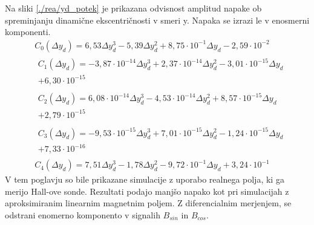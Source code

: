 Na sliki \ref{./rea/yd_potek} je prikazana odvisnost amplitud napake ob spreminjanju dinamične ekscentričnosti v smeri y. Napaka se izrazi le v enosmerni komponenti.
\begin{eqnarray}
&C_0(\Delta y_d) =6,53\Delta y_d^{3}-5,39\Delta y_d^{2}+8,75\cdot 10^{-1}\Delta y_d-2,59\cdot 10^{-2} \\                               
&\begin{split}C_1(\Delta y_d) =-3,87\cdot 10^{-14}\Delta y_d^{3}+2,37\cdot 10^{-14}\Delta y_d^{2}-3,01\cdot 10^{-15}\Delta y_d\\+6,30\cdot 10^{-15}\end{split} \\
&\begin{split}C_2(\Delta y_d) =6,08\cdot 10^{-14}\Delta y_d^{3}-4,53\cdot 10^{-14}\Delta y_d^{2}+8,57\cdot 10^{-15}\Delta y_d\\+2,79\cdot 10^{-15}\end{split} \\ 
&\begin{split}C_3(\Delta y_d) =-9,53\cdot 10^{-15}\Delta y_d^{3}+7,01\cdot 10^{-15}\Delta y_d^{2}-1,24\cdot 10^{-15}\Delta y_d\\+7,33\cdot 10^{-16}\end{split} \\
&C_4(\Delta y_d) =7,51\Delta y_d^{3}-1,78\Delta y_d^{2}-9,72\cdot 10^{-1}\Delta y_d+3,24\cdot 10^{-1}        
\end{eqnarray}
V tem poglavju so bile prikazane simulacije z uporabo realnega polja, ki ga merijo Hall-ove sonde. Rezultati podajo manjšo napako kot pri simulacijah z aproksimiranim linearnim magnetnim poljem. Z diferencialnim merjenjem, se odstrani enomerno komponento v signalih $B_{sin}$ in $B_{cos}$.